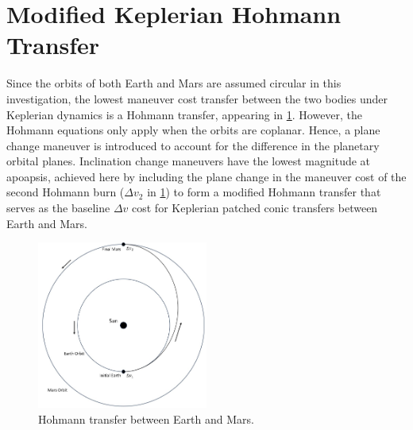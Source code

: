 \section{Modified Keplerian Hohmann Transfer}\label{sec:ModifiedHohmann}
Since the orbits of both Earth and Mars are assumed circular in this investigation, the lowest
maneuver cost transfer between the two bodies under Keplerian dynamics is a Hohmann transfer,
appearing in \cref{fig:Hohmann}. However, the Hohmann equations only apply when the orbits are
coplanar. Hence, a plane change maneuver is introduced to account for the difference in the
planetary orbital planes. Inclination change maneuvers have the lowest magnitude at apoapsis,
achieved here by including the plane change in the maneuver cost of the second Hohmann burn
($\Delta v_{2}$ in \cref{fig:Hohmann}) to form a modified Hohmann transfer that serves as the
baseline $\Delta v$ cost for Keplerian patched conic transfers between Earth and Mars.

\begin{figure}[H]
    \centering
    \includegraphics[width=0.5\textwidth]{figures/Hohmann.jpg}
    \caption{Hohmann transfer between Earth and Mars.}
    \label{fig:Hohmann}
\end{figure}

